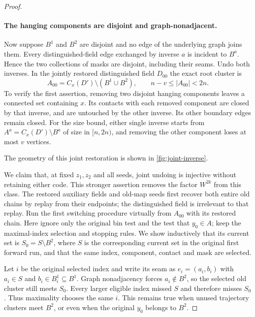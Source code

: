 \begin{proof}
\paragraph{The hanging components are disjoint and graph-nonadjacent.}
Now suppose $B^1$ and $B^2$ are disjoint and no edge of the underlying
graph joins them.  Every distinguished-field edge exchanged by inverse
$a$ is incident to $B^a$.  Hence the two collections of masks are
disjoint, including their seams.  Undo both inverses.  In the jointly
restored distinguished field $D_{00}$ the exact root cluster is
\begin{equation}\label{amp:joint-root}
 A_{00}=C_x(D')\setminus(B^1\cup B^2),
 \qquad n-v\le|A_{00}|<2n.
\end{equation}
To verify the first assertion, removing two disjoint hanging components
leaves a connected set containing $x$.  Its contacts with each removed
component are closed by that inverse, and are untouched by the other
inverse.  Its other boundary edges remain closed.  For the size bound,
either single inverse starts from
$A^a=C_x(D')\setminus B^a$ of size in $[n,2n)$, and removing the other
component loses at most $v$ vertices.

The geometry of this joint restoration is shown in
\cref{fig:joint-inverse}.


We claim that, at fixed $z_1,z_2$ and all seeds, joint undoing is injective
without retaining either code.  This stronger assertion removes the
factor $W^{2k}$ from this class.  The restored auxiliary fields and
old-map seeds first recover both entire old chains by replay from their
endpoints; the distinguished field is irrelevant to that replay.
Run the first switching procedure virtually from $A_{00}$ with its
restored chain.  Here ignore only the original bin test and the test
that $y_0\in A$; keep the maximal-index selection and stopping rules.
We show inductively that its current set is $S_0=S\setminus B^2$, where
$S$ is the corresponding current set in the original first forward run,
and that the same index, component, contact and mask are selected.

Let $i$ be the original selected index and write its seam as
$e_i=(a_i,b_i)$ with $a_i\in S$ and $b_i\in B_i^1\subseteq B^1$.
Graph nonadjacency forces $a_i\notin B^2$, so the selected old cluster
still meets $S_0$.  Every larger eligible index missed $S$ and therefore
misses $S_0$.  Thus maximality chooses the same $i$.  This remains true
when unused trajectory clusters meet $B^2$, or even when the original
$y_0$ belongs to $B^2$.


\end{proof}
